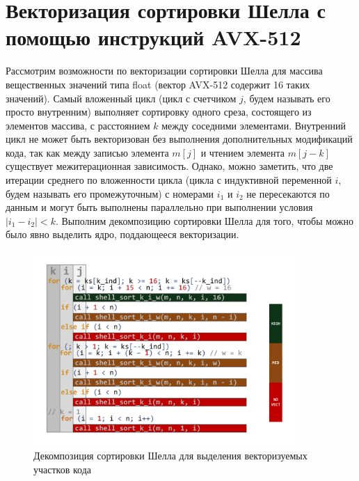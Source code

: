 \documentclass[utf8]{psta}
\begin{document}
\section{Векторизация сортировки Шелла с помощью инструкций AVX-512}

Рассмотрим возможности по векторизации сортировки Шелла для массива вещественных значений типа float (вектор AVX-512 содержит 16 таких значений). Самый вложенный цикл (цикл с счетчиком $j$, будем называть его просто внутренним) выполняет сортировку одного среза, состоящего из элементов массива, с расстоянием $k$ между соседними элементами.
Внутренний цикл не может быть векторизован без выполнения дополнительных модификаций кода, так как между записью элемента $m[j]$ и чтением элемента $m[j - k]$ существует межитерационная зависимость. Однако, можно заметить, что две итерации среднего по вложенности цикла (цикла с индуктивной переменной $i$, будем называть его промежуточным) с номерами $i_1$ и $i_2$ не пересекаются по данным и могут быть выполнены параллельно при выполнении условия $|i_1 - i_2| < k$. Выполним декомпозицию сортировки Шелла для того, чтобы можно было явно выделить ядро, поддающееся векторизации.

\begin{figure}
\includegraphics[width=10cm]{pics/pic_decomposition}
\caption{Декомпозиция сортировки Шелла для выделения векторизуемых участков кода}
\label{pic:decomposition}
\end{figure}
\end{document}

